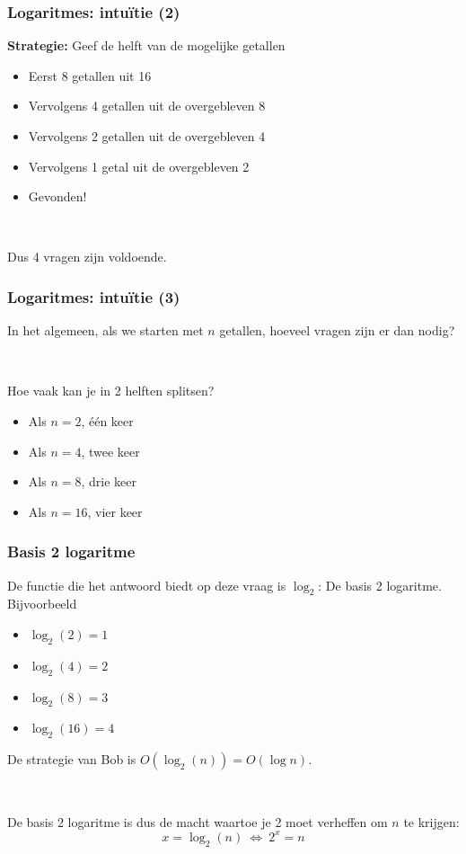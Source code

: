 \documentclass[12pt]{beamer}
\begin{document}
\begin{frame}
\frametitle{Logaritmes: intuïtie (2)}
\textbf{Strategie:} Geef de helft van de mogelijke getallen
\begin{itemize}
\item Eerst 8 getallen uit 16
\item Vervolgens 4 getallen uit de overgebleven 8
\item Vervolgens 2 getallen uit de overgebleven 4
\item Vervolgens 1 getal uit de overgebleven 2
\item Gevonden!
\end{itemize}

~

Dus 4 vragen zijn voldoende.
\end{frame}

\begin{frame}
\frametitle{Logaritmes: intuïtie (3)}
In het algemeen, als we starten met $n$ getallen, hoeveel vragen zijn er dan nodig?

~

Hoe vaak kan je in 2 helften splitsen?
\begin{itemize}
\item Als $n=2$, één keer
\item Als $n=4$, twee keer
\item Als $n=8$, drie keer
\item Als $n=16$, vier keer
\end{itemize}
\end{frame}

\begin{frame}
\frametitle{Basis 2 logaritme}
De functie die het antwoord biedt op deze vraag is $\log_2$: De basis 2 logaritme. Bijvoorbeeld
\begin{itemize}
\item $\log_2 (2) = 1$
\item $\log_2 (4) = 2$
\item $\log_2 (8) = 3$
\item $\log_2 (16) = 4$
\end{itemize}
De strategie van Bob is $O(\log_2(n)) = O(\log n)$.

~

De basis 2 logaritme is dus de macht waartoe je 2 moet verheffen om $n$ te krijgen:
\[ x = \log_2 (n)\ \Leftrightarrow\ 2^x = n \]
\end{frame}
\end{document}
